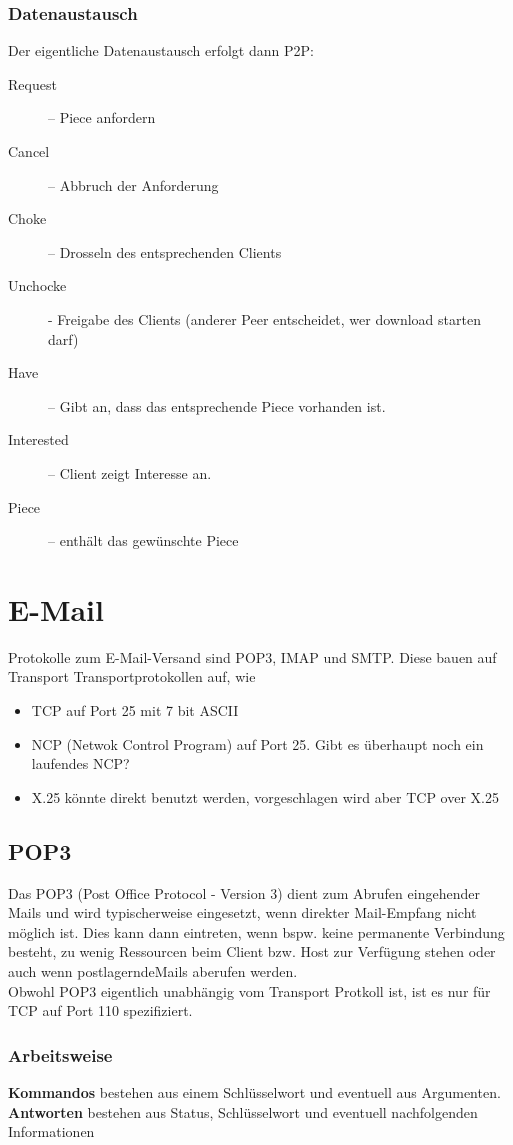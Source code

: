 \documentclass{article} %
\begin{document}
\subsubsection{Datenaustausch}
Der eigentliche Datenaustausch erfolgt dann P2P:
	\begin{description}
	\item[Request]  – Piece anfordern
	\item[Cancel] – Abbruch der Anforderung
	\item[Choke] – Drosseln des entsprechenden Clients
	\item[Unchocke] -  Freigabe des Clients (anderer Peer entscheidet, wer download starten darf)
	\item[Have]  – Gibt an, dass das entsprechende Piece vorhanden ist. 
	\item[Interested] – Client zeigt Interesse an. 
	\item[Piece] – enthält das gewünschte \glqq Piece\grqq 
	\end{description}

\section{E-Mail}
Protokolle zum E-Mail-Versand sind POP3, IMAP und SMTP. Diese bauen auf Transport Transportprotokollen auf, wie 
	\begin{itemize}
	\item TCP auf Port 25 mit 7 bit ASCII
	\item NCP (Netwok Control Program) auf Port 25. \glqq Gibt es überhaupt noch ein laufendes NCP? \grqq
	\item X.25 könnte direkt benutzt werden, vorgeschlagen wird aber TCP over X.25
	\end{itemize}
\subsection{POP3}
Das POP3 (Post Office Protocol - Version 3)\cite{rfc1939} dient zum Abrufen eingehender Mails  und wird typischerweise eingesetzt, wenn direkter Mail-Empfang nicht möglich ist. Dies kann dann eintreten, wenn bspw. keine permanente Verbindung besteht, zu wenig Ressourcen beim Client bzw. Host zur Verfügung stehen oder auch wenn \glqq postlagernde\grqq Mails aberufen werden.\\
Obwohl POP3 eigentlich unabhängig vom Transport Protkoll ist, ist es nur für TCP auf Port 110 spezifiziert.
\subsubsection{Arbeitsweise}
\textbf{Kommandos} bestehen aus einem Schlüsselwort und eventuell aus Argumenten. \textbf{Antworten} bestehen aus Status, Schlüsselwort und eventuell nachfolgenden Informationen 
\end{document}
